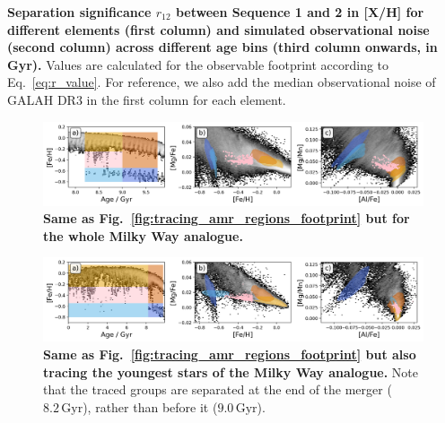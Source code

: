 \documentclass[fleqn,usenatbib]{mnras}
\begin{document}
\begin{table}
    \centering
    \caption{\textbf{Separation significance $r_{12}$ between Sequence 1 and 2 in {[X/H]} for different elements (first column) and simulated observational noise (second column) across different age bins (third column onwards, in Gyr).} Values are calculated for the observable footprint according to Eq.~\ref{eq:r_value}. For reference, we also add the median observational noise of GALAH DR3 in the first column for each element.}
    
    \label{tab:tabular_separation_r12_noise}
\end{table}

\begin{figure}
	\includegraphics[width=\textwidth]{figures/tracing_amr_regions_whole.png}
    \caption{
    \textbf{Same as Fig.~\ref{fig:tracing_amr_regions_footprint} but for the whole Milky Way analogue.}
    }
    \label{fig:tracing_amr_regions_whole}
\end{figure}

\begin{figure}
	\includegraphics[width=\textwidth]{figures/tracing_amr_regions_disk.png}
    \caption{
    \textbf{Same as Fig.~\ref{fig:tracing_amr_regions_footprint} but also tracing the youngest stars of the Milky Way analogue.} Note that the traced groups are separated at the end of the merger ($8.2\,\mathrm{Gyr}$), rather than before it ($9.0\,\mathrm{Gyr}$).
    }
    \label{fig:tracing_amr_regions_disk}
\end{figure}

\bsp	%
\label{lastpage}
\end{document}

